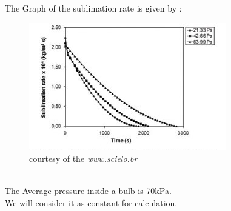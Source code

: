 \documentclass[a4paper]{article}
\begin{document}
\newpage
\huge{The Graph of the sublimation rate is given by : }
\begin{figure}[h!]
\begin{center}
\includegraphics[width=\linewidth]{rate.jpg}
\end{center}
\caption{\huge{courtesy of the \textit{www.scielo.br}}}
\label{fig:bulb2}
\end{figure}
\\The Average pressure inside a bulb is 70kPa.\\
We will consider it as constant for calculation.
\newpage
\end{document}
